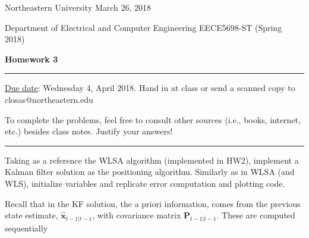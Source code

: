 \documentclass[11pt]{article}
\begin{document}
\noindent Northeastern University
\hfill March 26, 2018

\noindent Department of Electrical and Computer Engineering
\hfill EECE5698-ST (Spring 2018)

\noindent {} \hfill \textbf{Homework 3}

\noindent \rule{\linewidth}{1.5pt}

\vspace*{.5cm}

\underline{Due date}: Wednesday 4, April 2018. Hand in at class or send a scanned copy to closas@northeastern.edu

To complete the problems, feel free to consult other sources (i.e., books, internet, etc.) besides class notes.  Justify your answers!

\noindent \rule{\linewidth}{1pt}
\vspace*{1cm}


Taking as a reference the WLSA algorithm (implemented in HW2), implement a Kalman filter solution as the positioning algorithm. 
Similarly as in WLSA (and WLS), initialize variables and replicate error computation and plotting code.

Recall that in the KF solution, the a priori information, comes from the previous state estimate, $\hat{\mathbf{x}}_{t-1|t-1}$, with covariance matrix $\mathbf{P}_{t-1|t-1}$. These are computed sequentially
\end{document}
